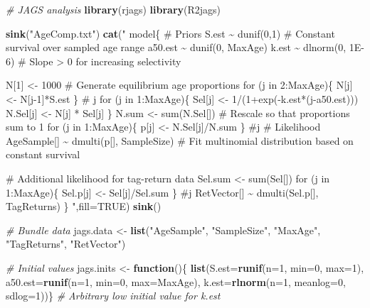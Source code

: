\documentclass[
]{krantz}
\makeatletter
\newenvironment{Shaded}{\begin{snugshade}}{\end{snugshade}}
\newcommand{\AttributeTok}[1]{\textcolor[rgb]{0.27,0.27,0.27}{#1}}
\newcommand{\CommentTok}[1]{\textcolor[rgb]{0.37,0.37,0.37}{\textit{#1}}}
\newcommand{\ConstantTok}[1]{\textcolor[rgb]{0.37,0.37,0.37}{#1}}
\newcommand{\ControlFlowTok}[1]{\textcolor[rgb]{0.27,0.27,0.27}{\textbf{#1}}}
\newcommand{\DecValTok}[1]{\textcolor[rgb]{0.06,0.06,0.06}{#1}}
\newcommand{\FunctionTok}[1]{\textcolor[rgb]{0.27,0.27,0.27}{\textbf{#1}}}
\newcommand{\NormalTok}[1]{#1}
\newcommand{\OtherTok}[1]{\textcolor[rgb]{0.37,0.37,0.37}{#1}}
\newcommand{\StringTok}[1]{\textcolor[rgb]{0.5,0.5,0.5}{#1}}
\newenvironment{kframe}{%
\medskip{}
\setlength{\fboxsep}{.8em}
 \def\at@end@of@kframe{}%
 \ifinner\ifhmode%
  \def\at@end@of@kframe{\end{minipage}}%
  \begin{minipage}{\columnwidth}%
 \fi\fi%
 \def\FrameCommand##1{\hskip\@totalleftmargin \hskip-\fboxsep
 \colorbox{shadecolor}{##1}\hskip-\fboxsep
     \hskip-\linewidth \hskip-\@totalleftmargin \hskip\columnwidth}%
 \MakeFramed {\advance\hsize-\width
   \@totalleftmargin\z@ \linewidth\hsize
   \@setminipage}}%
 {\par\unskip\endMakeFramed%
 \at@end@of@kframe}
\renewenvironment{Shaded}{\begin{kframe}}{\end{kframe}}
\makeatother
\begin{document}
\begin{Shaded}
\begin{Highlighting}[]
\CommentTok{\# JAGS analysis}
\FunctionTok{library}\NormalTok{(rjags)}
\FunctionTok{library}\NormalTok{(R2jags)}

\FunctionTok{sink}\NormalTok{(}\StringTok{"AgeComp.txt"}\NormalTok{)}
\FunctionTok{cat}\NormalTok{(}\StringTok{"}
\StringTok{model\{}
\StringTok{    \# Priors}
\StringTok{    S.est \textasciitilde{} dunif(0,1)  \# Constant survival over sampled age range}
\StringTok{    a50.est \textasciitilde{} dunif(0, MaxAge)}
\StringTok{    k.est \textasciitilde{} dlnorm(0, 1E{-}6) \# Slope \textgreater{} 0 for increasing selectivity}

\StringTok{    N[1] \textless{}{-} 1000}
\StringTok{    \# Generate equilibrium age proportions}
\StringTok{    for (j in 2:MaxAge)\{}
\StringTok{      N[j] \textless{}{-} N[j{-}1]*S.est}
\StringTok{    \} \# j}
\StringTok{    for (j in 1:MaxAge)\{}
\StringTok{    Sel[j] \textless{}{-} 1/(1+exp({-}k.est*(j{-}a50.est)))}
\StringTok{     N.Sel[j] \textless{}{-} N[j] * Sel[j]}
\StringTok{    \}}
\StringTok{    N.sum \textless{}{-} sum(N.Sel[]) \# Rescale so that proportions sum to 1}
\StringTok{    for (j in 1:MaxAge)\{}
\StringTok{    p[j] \textless{}{-} N.Sel[j]/N.sum}
\StringTok{    \} \#j}
\StringTok{    \# Likelihood}
\StringTok{    AgeSample[] \textasciitilde{} dmulti(p[], SampleSize)  }
\StringTok{      \# Fit multinomial distribution based on constant survival}

\StringTok{    \# Additional likelihood for tag{-}return data}
\StringTok{    Sel.sum \textless{}{-} sum(Sel[])}
\StringTok{    for (j in 1:MaxAge)\{}
\StringTok{    Sel.p[j] \textless{}{-} Sel[j]/Sel.sum}
\StringTok{    \} \#j}
\StringTok{    RetVector[] \textasciitilde{} dmulti(Sel.p[], TagReturns)    }
\StringTok{\}}
\StringTok{    "}\NormalTok{,}\AttributeTok{fill=}\ConstantTok{TRUE}\NormalTok{)}
\FunctionTok{sink}\NormalTok{()}

\CommentTok{\# Bundle data}
\NormalTok{jags.data }\OtherTok{\textless{}{-}} \FunctionTok{list}\NormalTok{(}\StringTok{"AgeSample"}\NormalTok{, }\StringTok{"SampleSize"}\NormalTok{, }\StringTok{"MaxAge"}\NormalTok{, }
                  \StringTok{"TagReturns"}\NormalTok{, }\StringTok{"RetVector"}\NormalTok{)}

\CommentTok{\# Initial values}
\NormalTok{jags.inits }\OtherTok{\textless{}{-}} \ControlFlowTok{function}\NormalTok{()\{ }\FunctionTok{list}\NormalTok{(}\AttributeTok{S.est=}\FunctionTok{runif}\NormalTok{(}\AttributeTok{n=}\DecValTok{1}\NormalTok{, }\AttributeTok{min=}\DecValTok{0}\NormalTok{, }\AttributeTok{max=}\DecValTok{1}\NormalTok{),}
                               \AttributeTok{a50.est=}\FunctionTok{runif}\NormalTok{(}\AttributeTok{n=}\DecValTok{1}\NormalTok{, }\AttributeTok{min=}\DecValTok{0}\NormalTok{, }\AttributeTok{max=}\NormalTok{MaxAge),}
                               \AttributeTok{k.est=}\FunctionTok{rlnorm}\NormalTok{(}\AttributeTok{n=}\DecValTok{1}\NormalTok{, }\AttributeTok{meanlog=}\DecValTok{0}\NormalTok{, }\AttributeTok{sdlog=}\DecValTok{1}\NormalTok{))\} }
                            \CommentTok{\# Arbitrary low initial value for k.est}


\end{Highlighting}
\end{Shaded}
\end{document}
